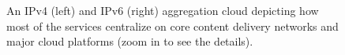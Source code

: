 \begin{figure}[t]
  \begin{minipage}[t]{0.50\textwidth}
    \centering
  \end{minipage}
  \begin{minipage}[t]{0.50\textwidth}
    \centering
  \end{minipage}
  \caption{\label{fig:v4-v6-cloud}An IPv4 (left) and IPv6 (right) aggregation
cloud depicting how most of the services centralize on core content delivery
networks and major cloud platforms (zoom in to see the details).}
\end{figure}

